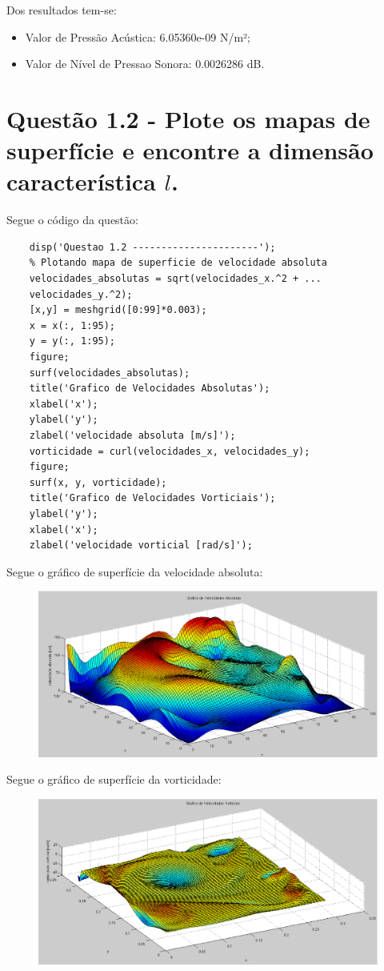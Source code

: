 	Dos resultados tem-se:
	\begin{itemize}
		\item Valor de Pressão Acústica: 6.05360e-09 N/m²;
		\item Valor de Nível de Pressao Sonora: 0.0026286 dB.	
	\end{itemize}
	

	\section{Questão 1.2 - Plote os mapas de superfície e encontre a dimensão característica $l$.}
	Segue o código da questão:
	\begin{lstlisting}
	disp('Questao 1.2 ----------------------');
	% Plotando mapa de superficie de velocidade absoluta
	velocidades_absolutas = sqrt(velocidades_x.^2 + ...
	velocidades_y.^2);
	[x,y] = meshgrid([0:99]*0.003);
	x = x(:, 1:95);
	y = y(:, 1:95);
	figure;
	surf(velocidades_absolutas);
	title('Grafico de Velocidades Absolutas');
	xlabel('x');
	ylabel('y');
	zlabel('velocidade absoluta [m/s]');
	vorticidade = curl(velocidades_x, velocidades_y);
	figure;
	surf(x, y, vorticidade);
	title('Grafico de Velocidades Vorticiais');
	ylabel('y');
	xlabel('x');
	zlabel('velocidade vorticial [rad/s]');
	\end{lstlisting}

	Segue o gráfico de superfície da velocidade absoluta:
	\begin{figure}[h]
	\centering
		\includegraphics[keepaspectratio=true,scale=0.4]{figuras/velocidade_absoluta.eps}
	\end{figure}

	Segue o gráfico de superfície da vorticidade:
	\begin{figure}[h]
	\centering
		\includegraphics[keepaspectratio=true,scale=0.4]{figuras/vorticidade.eps}
	\end{figure}


